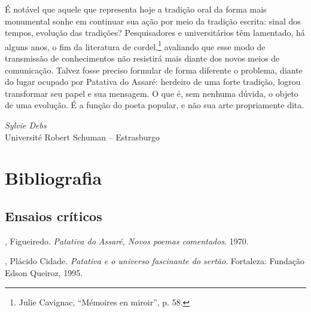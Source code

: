 É notável que aquele que representa hoje a tradição oral da forma mais
monumental sonhe em continuar sua ação por meio da tradição escrita: sinal dos
tempos, evolução das tradições? Pesquisadores e universitários têm lamentado, há
alguns anos, o fim da literatura de cordel,\footnote{ Julie Cavignac, “Mémoires
en miroir”, p. 58.} avaliando que esse modo de transmissão de conhecimentos não
resistirá mais diante dos novos meios de comunicação. Talvez fosse preciso
formular de forma diferente o problema, diante do lugar ocupado por Patativa do
Assaré: herdeiro de uma forte tradição, logrou transformar seu papel e sua
mensagem. O que é, sem nenhuma dúvida, o objeto de uma evolução. É a função do
poeta popular, e não sua arte propriamente dita.

\begin{flushright}
\textit{Sylvie Debs}\\
Université Robert Schuman -- Estrasburgo
\end{flushright}


\bigskip

%
%
%
%
%
%
%
%

\pagebreak

\section{Bibliografia}

\subsection{Ensaios críticos}

\begin{bibliografia}[]

, Figueiredo. \textit{Patativa do Assaré, Novos poemas 
comentados}. 1970.

, Plácido Cidade. \textit{Patativa e o universo fascinante
do sertão}. Fortaleza: Fundação Edson Queiroz, 1995.

\end{bibliografia}

